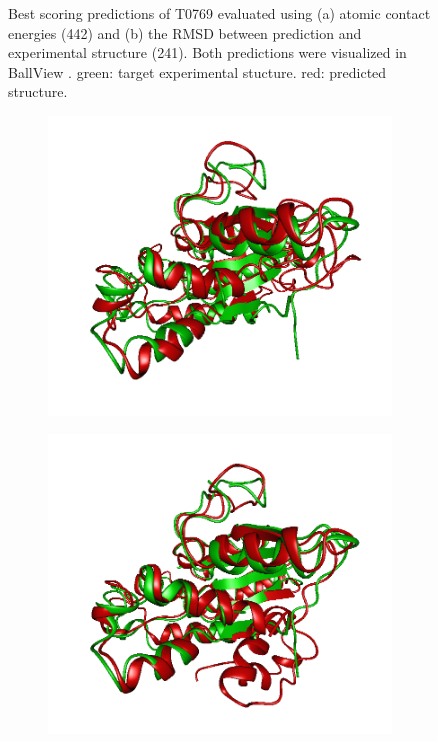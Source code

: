 \documentclass[11pt,a4paper]{article}
\renewcommand{\(}{\left (}
\renewcommand{\)}{\right )}
\begin{document}
\begin{figure}[!h]
\begin{subfigure}{.5\textwidth}
		\subcaption{}
	\end{subfigure}
	 \caption{Best scoring predictions of T0769 evaluated using (a) atomic contact energies (442) and (b) the RMSD between prediction and experimental structure (241). Both predictions were visualized in BallView \citep{ballview}. green: target experimental stucture. red: predicted structure.}
\end{figure}

\begin{figure}[!h]
	\begin{subfigure}{.5\textwidth}
		\includegraphics[width=\textwidth]{figures/T0776TS300}
		\subcaption{}
	\end{subfigure}
	\begin{subfigure}{.5\textwidth}
		\includegraphics[width=\textwidth]{figures/T0776TS420}

\end{subfigure}
\end{figure}
\end{document}
